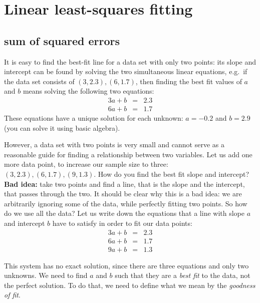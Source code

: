 \documentclass[
  letterpaper,
  DIV=11,
  numbers=noendperiod]{scrreprt}
\begin{document}
\hypertarget{linear-least-squares-fitting}{%
\section{Linear least-squares
fitting}\label{linear-least-squares-fitting}}

\label{sec:math8}

\hypertarget{sum-of-squared-errors}{%
\subsection{sum of squared errors}\label{sum-of-squared-errors}}

It is easy to find the best-fit line for a data set with only two
points: its slope and intercept can be found by solving the two
simultaneous linear equations, e.g.~if the data set consists of
\((3,2.3), (6, 1.7)\), then finding the best fit values of \(a\) and
\(b\) means solving the following two equations: \begin{eqnarray*}
3a + b &=&  2.3 \\
6a + b &=& 1.7
\end{eqnarray*} These equations have a unique solution for each unknown:
\(a=-0.2\) and \(b=2.9\) (you can solve it using basic algebra).

However, a data set with two points is very small and cannot serve as a
reasonable guide for finding a relationship between two variables. Let
us add one more data point, to increase our sample size to three:
\((3,2.3), (6, 1.7), (9, 1.3)\). How do you find the best fit slope and
intercept? \textbf{Bad idea:} take two points and find a line, that is
the slope and the intercept, that passes through the two. It should be
clear why this is a bad idea: we are arbitrarily ignoring some of the
data, while perfectly fitting two points. So how do we use all the data?
Let us write down the equations that a line with slope \(a\) and
intercept \(b\) have to satisfy in order to fit our data points:
\begin{eqnarray}
3a + b &=&  2.3 \\
6a + b &=& 1.7 \\
9a + b &=& 1.3
\end{eqnarray}

This system has no exact solution, since there are three equations and
only two unknowns. We need to find \(a\) and \(b\) such that they are a
\emph{best fit} to the data, not the perfect solution. To do that, we
need to define what we mean by the 
\emph{goodness of fit}.
\end{document}
